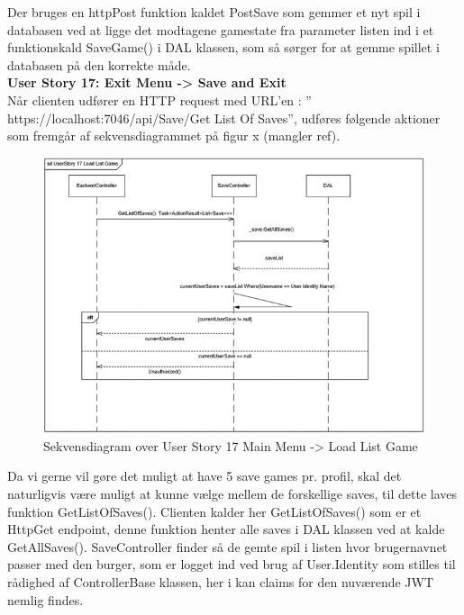 Der bruges en httpPost funktion kaldet PostSave som gemmer et nyt spil i databasen ved at ligge det modtagene gamestate fra parameter listen ind i et funktionskald SaveGame() i DAL klassen, som så sørger for at gemme spillet i databasen på den korrekte måde.\\

\textbf{User Story 17: Exit Menu -> Save and Exit}\\

Når clienten udfører en HTTP request med URL’en : ” https://localhost:7046/api/Save/Get List Of Saves”, udføres følgende aktioner som fremgår af sekvensdiagrammet på figur x (mangler ref).\\

\begin{figure}[H]
\centering
\includegraphics[width = \textwidth]{02-Body/Images/Backend_sekvens_17.PNG}
\caption{Sekvensdiagram over User Story 17 Main Menu -> Load List Game}
\label{fig:Design-Backend-Sekvens-17}
\end{figure}

Da vi gerne vil gøre det muligt at have 5 save games pr. profil, skal det naturligvis være muligt at kunne vælge mellem de forskellige saves, til dette laves funktion GetListOfSaves(). Clienten kalder her GetListOfSaves() som er et HttpGet endpoint, denne funktion henter alle saves i DAL klassen ved at kalde GetAllSaves(). SaveController finder så de gemte spil i listen hvor brugernavnet passer med den burger, som er logget ind ved brug af User.Identity som stilles til rådighed af ControllerBase klassen, her i kan claims for den nuværende JWT nemlig findes.\\

